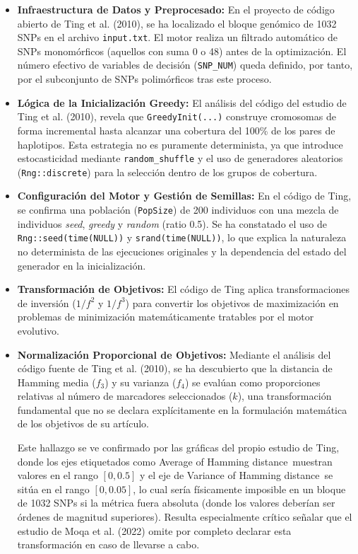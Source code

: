 \documentclass[a4paper,10pt]{article}
\begin{document}
\begin{itemize}
    \item \textbf{Infraestructura de Datos y Preprocesado:} En el proyecto de código abierto de Ting et al. (2010), se ha localizado el bloque genómico de 1032 SNPs en el archivo \texttt{input.txt}. El motor realiza un filtrado automático de SNPs monomórficos (aquellos con suma 0 o 48) antes de la optimización. El número efectivo de variables de decisión (\texttt{SNP\_NUM}) queda definido, por tanto, por el subconjunto de SNPs polimórficos tras este proceso.
    \item \textbf{Lógica de la Inicialización Greedy:} El análisis del código del estudio de Ting et al. (2010), revela que \texttt{GreedyInit(...)} construye cromosomas de forma incremental hasta alcanzar una cobertura del 100\% de los pares de haplotipos. Esta estrategia no es puramente determinista, ya que introduce estocasticidad mediante \texttt{random\_shuffle} y el uso de generadores aleatorios (\texttt{Rng::discrete}) para la selección dentro de los grupos de cobertura.
    \item \textbf{Configuración del Motor y Gestión de Semillas:} En el código de Ting, se confirma una población (\texttt{PopSize}) de 200 individuos con una mezcla de individuos \textit{seed}, \textit{greedy} y \textit{random} (ratio 0.5). Se ha constatado el uso de \texttt{Rng::seed(time(NULL))} y \texttt{srand(time(NULL))}, lo que explica la naturaleza no determinista de las ejecuciones originales y la dependencia del estado del generador en la inicialización.
    \item \textbf{Transformación de Objetivos:} El código de Ting aplica transformaciones de inversión ($1/f^2$ y $1/f^3$) para convertir los objetivos de maximización en problemas de minimización matemáticamente tratables por el motor evolutivo.
    \item \textbf{Normalización Proporcional de Objetivos:} Mediante el análisis del código fuente de Ting et al. (2010), se ha descubierto que la distancia de Hamming media ($f_3$) y su varianza ($f_4$) se evalúan como proporciones relativas al número de marcadores seleccionados ($k$), una transformación fundamental que no se declara explícitamente en la formulación matemática de los objetivos de su artículo. 
    
    Este hallazgo se ve confirmado por las gráficas del propio estudio de Ting, donde los ejes etiquetados como \guillemotleft Average of Hamming distance\guillemotright\ muestran valores en el rango $[0, 0.5]$ y el eje de \guillemotleft Variance of Hamming distance\guillemotright\ se sitúa en el rango $[0, 0.05]$, lo cual sería físicamente imposible en un bloque de 1032 SNPs si la métrica fuera absoluta (donde los valores deberían ser órdenes de magnitud superiores). Resulta especialmente crítico señalar que el estudio de Moqa et al. (2022) omite por completo declarar esta transformación en caso de llevarse a cabo.
    

\end{itemize}
\end{document}
